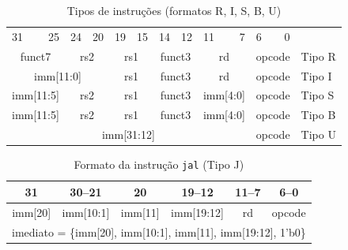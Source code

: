 \documentclass[
	12pt,				%
	oneside,
	a4paper,			%
	english,			%
	french,				%
	spanish,			%
	brazil,				%
	]{abntex2}
\begin{document}
\begin{table}[H]
\centering
\caption{Tipos de instruções (formatos R, I, S, B, U)}
\label{tab:InstTypes}
\ABNTEXfontereduzida
\begin{tabular}{crcrcrcrcrcrl}
\multicolumn{1}{l}{31}      & 25    & \multicolumn{1}{l}{24} & 20 & \multicolumn{1}{l}{19} & 15 & \multicolumn{1}{l}{14} & 12 & \multicolumn{1}{l}{11}     & 7    & \multicolumn{1}{l}{6}  & 0  &        \\ \cline{1-12}
\multicolumn{2}{|c|}{funct7}        & \multicolumn{2}{c|}{rs2}    & \multicolumn{2}{c|}{rs1}    & \multicolumn{2}{c|}{funct3} & \multicolumn{2}{c|}{rd}           & \multicolumn{2}{c|}{opcode} & Tipo R \\ \cline{1-12}
\multicolumn{4}{|c|}{imm[11:0]}                               & \multicolumn{2}{c|}{rs1}    & \multicolumn{2}{c|}{funct3} & \multicolumn{2}{c|}{rd}           & \multicolumn{2}{c|}{opcode} & Tipo I \\ \cline{1-12}
\multicolumn{2}{|c|}{imm[11:5]} & \multicolumn{2}{c|}{rs2}    & \multicolumn{2}{c|}{rs1}    & \multicolumn{2}{c|}{funct3} & \multicolumn{2}{c|}{imm[4:0]} & \multicolumn{2}{c|}{opcode} & Tipo S \\ \cline{1-12}
\multicolumn{2}{|c|}{imm[11:5]} & \multicolumn{2}{c|}{rs2}    & \multicolumn{2}{c|}{rs1}    & \multicolumn{2}{c|}{funct3} & \multicolumn{2}{c|}{imm[4:0]} & \multicolumn{2}{c|}{opcode} & Tipo B \\ \cline{1-12}
\multicolumn{10}{|c|}{imm[31:12]}                                                                                                                             & \multicolumn{2}{c|}{opcode} & Tipo U \\ \cline{1-12}
\end{tabular}
\end{table}

\begin{table}[H]
\centering
\caption{Formato da instrução \texttt{jal} (Tipo J)}
\label{tab:Jal}
\ABNTEXfontereduzida
\begin{tabular}{|c|c|c|c|c|c|}
\hline
\multicolumn{1}{|c|}{31} & \multicolumn{1}{c|}{30–21} & \multicolumn{1}{c|}{20} & \multicolumn{1}{c|}{19–12} & \multicolumn{1}{c|}{11–7} & \multicolumn{1}{c|}{6–0} \\ \hline
imm[20] & imm[10:1] & imm[11] & imm[19:12] & rd & opcode \\ \hline
\multicolumn{6}{|c|}{imediato = \{imm[20], imm[10:1], imm[11], imm[19:12], 1'b0\}} \\ \hline
\end{tabular}
\end{table}
\end{document}
